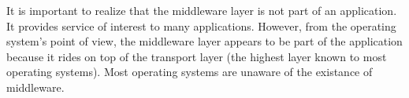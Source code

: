 \documentclass[12pt]{examdesign}
\begin{document}
\begin{shortanswer}[title={Short Answer}]
\begin{question}
\begin{answer}
     It is important to realize that the middleware layer is not part of an application. It provides service of interest to many applications. However, from the operating system's point of view, the middleware layer appears to be part of the application because it rides on top of the transport layer (the highest layer known to most operating systems). Most operating systems are unaware of the existance of middleware.
    \end{answer}
    \pagebreak
  \end{question}

\end{shortanswer}
\end{document}
